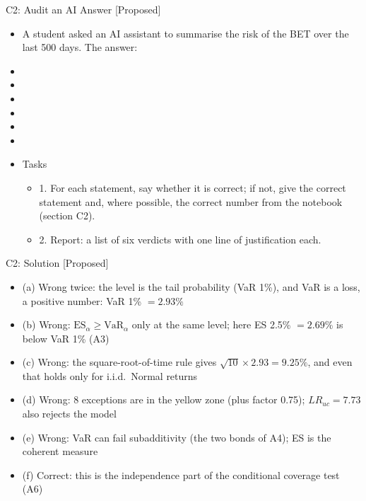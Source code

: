 \begin{frame}{C2: Audit an AI Answer [Proposed]}
\itemsize{\scriptsize}
\begin{itemize}
    \item A student asked an AI assistant to summarise the risk of the BET over the last 500 days. The answer:
    \item {}
    \item {}
    \item {}
    \item {}
    \item {}
    \item {}
    \item Tasks
    \begin{itemize}
        \item 1. For each statement, say whether it is correct; if not, give the correct statement and, where possible, the correct number from the notebook (section C2).
        \item 2. Report: a list of six verdicts with one line of justification each.
    \end{itemize}
\end{itemize}
\end{frame}

\ifsolutions
\begin{frame}{C2: Solution [Proposed]}
\itemsize{\footnotesize}
\begin{itemize}
    \item (a) Wrong twice: the level is the tail probability (VaR 1\%), and VaR is a loss, a positive number: VaR 1\% $= 2.93\%$
    \item (b) Wrong: $\mathrm{ES}_\alpha \ge \mathrm{VaR}_\alpha$ only at the same level; here ES 2.5\% $= 2.69\%$ is below VaR 1\% (A3)
    \item (c) Wrong: the square-root-of-time rule gives $\sqrt{10} \times 2.93 = 9.25\%$, and even that holds only for i.i.d.\ Normal returns
    \item (d) Wrong: 8 exceptions are in the yellow zone (plus factor 0.75); $LR_{uc} = 7.73$ also rejects the model
    \item (e) Wrong: VaR can fail subadditivity (the two bonds of A4); ES is the coherent measure
    \item (f) Correct: this is the independence part of the conditional coverage test (A6)
\end{itemize}
\end{frame}
\fi


